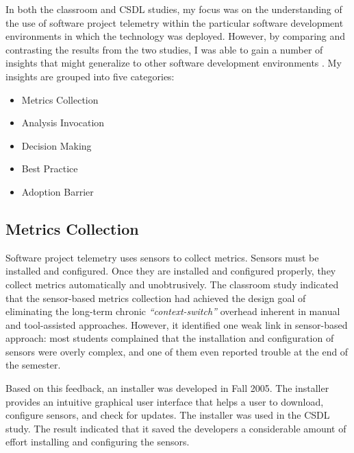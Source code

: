 In both the classroom and CSDL studies, my focus was on the understanding of the use of software project telemetry within the particular software development environments in which the technology was deployed. However, by comparing and contrasting the results from the two studies, I was able to gain a number of insights that might generalize to other software development environments . My insights are grouped into five categories:
\begin{itemize}
  \setlength{\itemsep}{0pt}
  \setlength{\parskip}{0pt}
	\item Metrics Collection
	\item Analysis Invocation
	\item Decision Making
	\item Best Practice
	\item Adoption Barrier
\end{itemize}








\subsection{Metrics Collection}

Software project telemetry uses sensors to collect metrics. Sensors must be installed and configured. Once they are installed and configured properly, they collect metrics automatically and unobtrusively. The classroom study indicated that the sensor-based metrics collection had achieved the design goal of eliminating the long-term chronic \textit{``context-switch''} overhead inherent in manual and tool-assisted approaches. However, it identified one weak link in sensor-based approach: most students complained that the installation and configuration of sensors were overly complex, and one of them even reported trouble at the end of the semester.

Based on this feedback, an installer was developed in Fall 2005. The installer provides an intuitive graphical user interface that helps a user to download, configure sensors, and check for updates. The installer was used in the CSDL study. The result indicated that it saved the developers a considerable amount of effort installing and configuring the sensors. 

